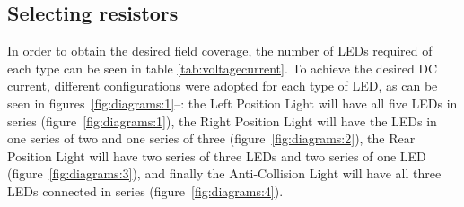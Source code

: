 \subsection{Selecting resistors}
\label{subsection:resistors}
In order to obtain the desired field coverage, the number of LEDs required of each type can be seen in table \ref{tab:voltagecurrent}. To achieve the desired DC current, different configurations were adopted for each type of LED, as can be seen in figures~\ref{fig:diagrams:1}--: the Left Position Light will have all five LEDs in series (figure~\ref{fig:diagrams:1}), the Right Position Light will have the LEDs in one series of two and one series of three (figure~\ref{fig:diagrams:2}), the Rear Position Light will have two series of three LEDs and two series of one LED (figure~\ref{fig:diagrams:3}), and finally the Anti-Collision Light will have all three LEDs connected in series (figure~\ref{fig:diagrams:4}).\\

